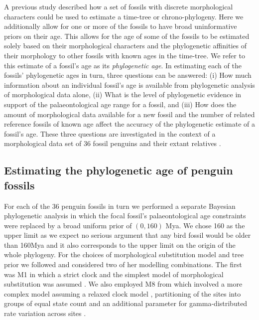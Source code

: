 \documentclass[11pt]{article}
\newcommand{\Mstrict}{{M1}}
\newcommand{\Mrelaxed}{{M8}}
\begin{document}
A previous study described how a set of fossils with discrete morphological characters could be used to estimate a time-tree or chrono-phylogeny. Here we additionally allow for one or more of the fossils to have broad uninformative priors on their age. This allows for the age of some of the fossils to be estimated solely based on their morphological characters and the phylogenetic affinities of their morphology to other fossils with known ages in the time-tree. We refer to this estimate of a fossil's age as its {\em phylogenetic age}. In estimating each of the fossils' phylogenetic ages in turn, three questions can be answered: (i) How much information about an individual fossil's age is available from phylogenetic analysis of morphological data alone, (ii) What is the level of phylogenetic evidence in support of the palaeontological age range for a fossil, and (iii) How does the amount of morphological data available for a new fossil and the number of related reference fossils of known age affect the accuracy of the phylogenetic estimate of a fossil's age. These three questions are investigated in the context of a morphological data set of 36 fossil penguins and their extant relatives \autocite{ksepka2010,ksepka2012,gavryushkina2015bayesian}.

\subsection*{Estimating the phylogenetic age of penguin fossils}

For each of the 36 penguin fossils in turn we performed a separate Bayesian phylogenetic analysis in which the focal fossil's palaeontological age constraints were replaced by a broad uniform prior of $(0,160)$ Mya. We chose 160 as the upper limit as we expect no serious argument that any bird fossil would be older than 160Mya and it also corresponds to the upper limit on the origin of the whole phylogeny. For the choices of morphological substitution model and tree prior we followed \textcite{gavryushkina2015bayesian} and considered two of her modelling combinations. The first was \Mstrict{} in which a strict clock and the simplest model of morphological substitution was assumed \autocite{Lewis2001}. We also employed \Mrelaxed{} from \textcite{gavryushkina2015bayesian} which involved a more complex model assuming a relaxed clock model \autocite{Drummond2006}, partitioning of the sites into groups of equal state count and an additional parameter for gamma-distributed rate variation across sites \autocite{yang:1994ma}.
\end{document}
